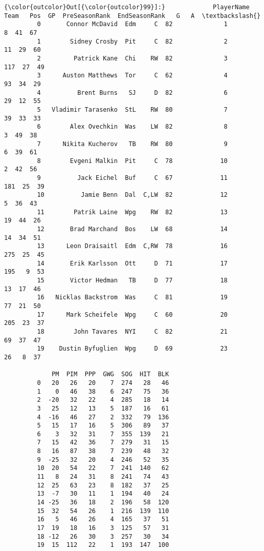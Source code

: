 \documentclass[11pt]{article}
\begin{document}
\begin{Verbatim}[commandchars=\\\{\}]
{\color{outcolor}Out[{\color{outcolor}99}]:}             PlayerName Team   Pos  GP  PreSeasonRank  EndSeasonRank   G   A  \textbackslash{}
         0       Connor McDavid  Edm     C  82              1              8  41  67   
         1        Sidney Crosby  Pit     C  82              2             11  29  60   
         2         Patrick Kane  Chi    RW  82              3            117  27  49   
         3      Auston Matthews  Tor     C  62              4             93  34  29   
         4          Brent Burns   SJ     D  82              6             29  12  55   
         5   Vladimir Tarasenko  StL    RW  80              7             39  33  33   
         6        Alex Ovechkin  Was    LW  82              8              3  49  38   
         7      Nikita Kucherov   TB    RW  80              9              6  39  61   
         8        Evgeni Malkin  Pit     C  78             10              2  42  56   
         9          Jack Eichel  Buf     C  67             11            181  25  39   
         10          Jamie Benn  Dal  C,LW  82             12              5  36  43   
         11        Patrik Laine  Wpg    RW  82             13             19  44  26   
         12       Brad Marchand  Bos    LW  68             14             14  34  51   
         13      Leon Draisaitl  Edm  C,RW  78             16            275  25  45   
         14       Erik Karlsson  Ott     D  71             17            195   9  53   
         15       Victor Hedman   TB     D  77             18             13  17  46   
         16   Nicklas Backstrom  Was     C  81             19             77  21  50   
         17      Mark Scheifele  Wpg     C  60             20            205  23  37   
         18        John Tavares  NYI     C  82             21             69  37  47   
         19    Dustin Byfuglien  Wpg     D  69             23             26   8  37   
         
             PM  PIM  PPP  GWG  SOG  HIT  BLK  
         0   20   26   20    7  274   28   46  
         1    0   46   38    6  247   75   36  
         2  -20   32   22    4  285   18   14  
         3   25   12   13    5  187   16   61  
         4  -16   46   27    2  332   79  136  
         5   15   17   16    5  306   89   37  
         6    3   32   31    7  355  139   21  
         7   15   42   36    7  279   31   15  
         8   16   87   38    7  239   48   32  
         9  -25   32   20    4  246   52   35  
         10  20   54   22    7  241  140   62  
         11   8   24   31    8  241   74   43  
         12  25   63   23    8  182   37   25  
         13  -7   30   11    1  194   40   24  
         14 -25   36   18    2  196   58  120  
         15  32   54   26    1  216  139  110  
         16   5   46   26    4  165   37   51  
         17  19   18   16    3  125   57   31  
         18 -12   26   30    3  257   30   34  
         19  15  112   22    1  193  147  100  
\end{Verbatim}
            
\end{document}
